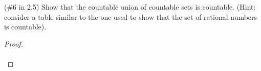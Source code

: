 (\#6 in 2.5) Show that the countable union of countable sets is countable. (Hint: consider a table similar to the one 
used to show that the set of rational numbers is countable).

\begin{proof}\renewcommand{\qedsymbol}{}\ \\\\
\end{proof}